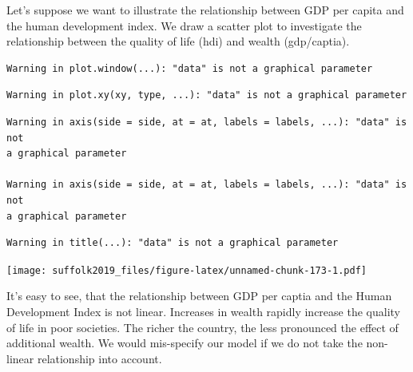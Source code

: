 \documentclass[]{article}
\newenvironment{Shaded}{\begin{snugshade}}{\end{snugshade}}
\newcommand{\DataTypeTok}[1]{\textcolor[rgb]{0.13,0.29,0.53}{#1}}
\newcommand{\DecValTok}[1]{\textcolor[rgb]{0.00,0.00,0.81}{#1}}
\newcommand{\KeywordTok}[1]{\textcolor[rgb]{0.13,0.29,0.53}{\textbf{#1}}}
\newcommand{\NormalTok}[1]{#1}
\newcommand{\OperatorTok}[1]{\textcolor[rgb]{0.81,0.36,0.00}{\textbf{#1}}}
\newcommand{\OtherTok}[1]{\textcolor[rgb]{0.56,0.35,0.01}{#1}}
\newcommand{\StringTok}[1]{\textcolor[rgb]{0.31,0.60,0.02}{#1}}
\begin{document}
Let's suppose we want to illustrate the relationship between GDP per capita and the human development index. We draw a scatter plot to investigate the relationship between the quality of life (hdi) and wealth (gdp/captia).

\begin{Shaded}
\end{Shaded}

\begin{verbatim}
Warning in plot.window(...): "data" is not a graphical parameter
\end{verbatim}

\begin{verbatim}
Warning in plot.xy(xy, type, ...): "data" is not a graphical parameter
\end{verbatim}

\begin{verbatim}
Warning in axis(side = side, at = at, labels = labels, ...): "data" is not
a graphical parameter

Warning in axis(side = side, at = at, labels = labels, ...): "data" is not
a graphical parameter
\end{verbatim}

\begin{verbatim}
Warning in title(...): "data" is not a graphical parameter
\end{verbatim}

\texttt{[image: suffolk2019\_files/figure-latex/unnamed-chunk-173-1.pdf]}

It's easy to see, that the relationship between GDP per captia and the Human Development Index is not linear. Increases in wealth rapidly increase the quality of life in poor societies. The richer the country, the less pronounced the effect of additional wealth. We would mis-specify our model if we do not take the non-linear relationship into account.
\end{document}
